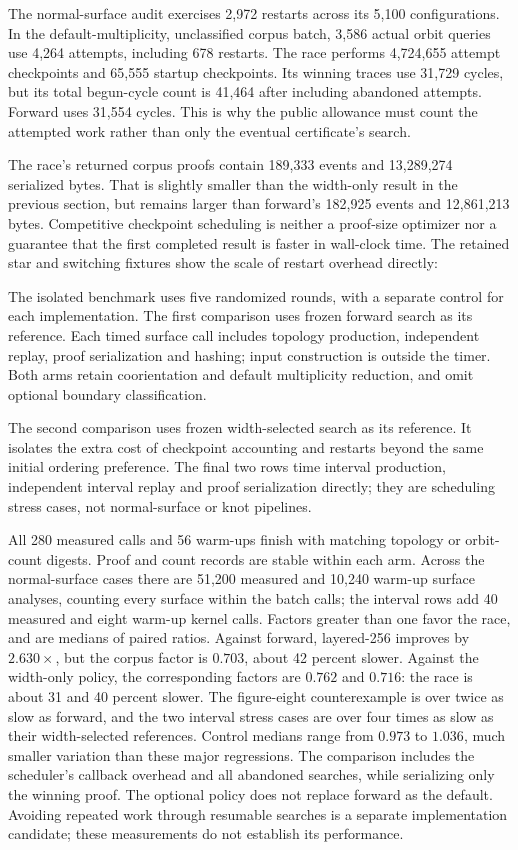 The normal-surface audit exercises 2,972 restarts across its 5,100
configurations. In the default-multiplicity, unclassified corpus batch,
3,586 actual orbit queries use 4,264 attempts, including 678 restarts.
The race performs 4,724,655 attempt checkpoints and 65,555 startup checkpoints.
Its winning traces use 31,729 cycles, but its total begun-cycle count is
41,464 after including abandoned attempts. Forward uses 31,554 cycles.
This is why the public allowance must count the attempted work rather than
only the eventual certificate's search.

The race's returned corpus proofs contain 189,333 events and 13,289,274
serialized bytes. That is slightly smaller than the width-only result in
the previous section, but remains larger than forward's 182,925 events and
12,861,213 bytes. Competitive checkpoint scheduling is neither a proof-size
optimizer nor a guarantee that the first completed result is faster in
wall-clock time. The retained star and switching fixtures show the scale
of restart overhead directly:


The isolated benchmark uses five randomized rounds, with a separate control
for each implementation. The first comparison uses frozen forward search
as its reference. Each timed surface call includes topology production,
independent replay, proof serialization and hashing; input construction
is outside the timer. Both arms retain coorientation and default multiplicity
reduction, and omit optional boundary classification.


The second comparison uses frozen width-selected search as its reference.
It isolates the extra cost of checkpoint accounting and restarts beyond
the same initial ordering preference. The final two rows time interval
production, independent interval replay and proof serialization directly;
they are scheduling stress cases, not normal-surface or knot pipelines.


All 280 measured calls and 56 warm-ups finish with matching topology or
orbit-count digests. Proof and count records are stable within each arm.
Across the normal-surface cases there are 51,200 measured and 10,240 warm-up
surface analyses, counting every surface within the batch calls;
the interval rows add 40 measured and eight warm-up kernel calls.
Factors greater than one favor the race, and are medians of paired ratios.
Against forward, layered-256 improves by $2.630\times$, but the corpus
factor is $0.703$, about 42 percent slower. Against the width-only policy,
the corresponding factors are $0.762$ and $0.716$: the race is about
31 and 40 percent slower. The figure-eight counterexample is over twice
as slow as forward, and the two interval stress cases are over four times
as slow as their width-selected references. Control medians range from
$0.973$ to $1.036$, much smaller variation than these major regressions.
The comparison includes the scheduler's callback overhead and all abandoned
searches, while serializing only the winning proof. The optional policy
does not replace forward as the default. Avoiding repeated work through
resumable searches is a separate implementation candidate; these measurements
do not establish its performance.

